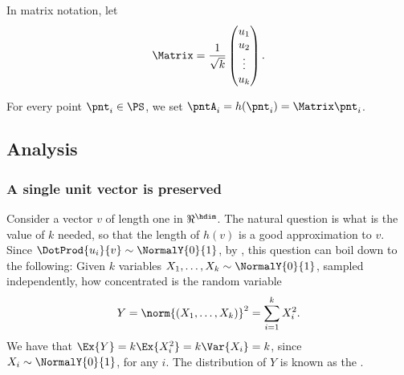 In matrix notation, let
\begin{equation*}
    \Matrix = \frac{1}{\sqrt{k}} 
    \begin{pmatrix} u_1\\ u_2\\ \vdots\\ u_k
        \end{pmatrix}.    
\end{equation*}

For every point $\pnt_i \in \PS$, we set
$\pntA_i = h(\pnt_i) = \Matrix \pnt_i$.


\subsection{Analysis}

\subsubsection{A single unit vector is preserved}




Consider a vector $v$ of length one in $\Re^\hdim$. The natural
question is what is the value of $k$ needed, so that the length of
$h(v)$ is a good approximation to $v$.  Since
$\DotProd{u_i}{v} \sim \NormalY{0}{1}$, by
, this question can boil down to the
following: Given $k$ variables $X_1, \ldots, X_k \sim \NormalY{0}{1}$,
sampled independently, how concentrated is the random variable
\begin{equation*}
    Y%
    =%
    \norm{(X_1, \ldots, X_k)}^2%
    =%
    \sum_{i=1}^k X_i^2.
\end{equation*}
We have that $\Ex{Y} = k \Ex{X_i^2} = k \Var{X_i} = k$, since
$X_i \sim \NormalY{0}{1}$, for any $i$. The distribution of $Y$ is
known as the .

